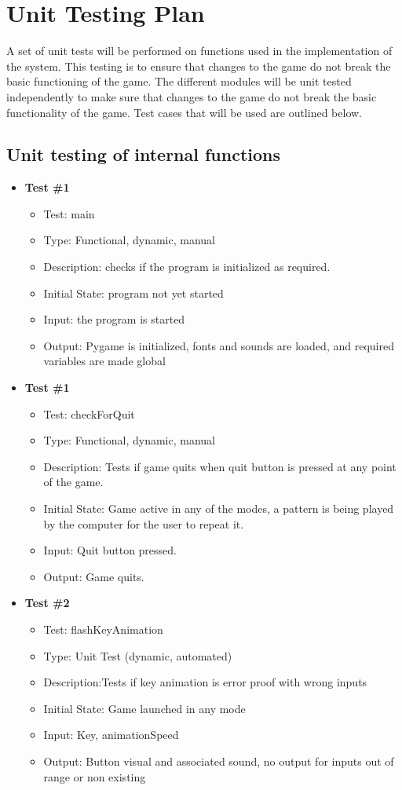 \documentclass[12pt, titlepage]{article}
\begin{document}
\section{Unit Testing Plan}
A set of unit tests will be performed on functions used in the implementation of the system. This testing is to ensure that changes to the game do not break the basic functioning of the game. The different modules will be unit tested independently to make sure that changes to the game do not break the basic functionality of the game. Test cases that will be used are outlined below.

\subsection{Unit testing of internal functions}

\begin{itemize}
\item \textbf{Test \#1}
\begin{itemize}
\item Test: main
\item Type: Functional, dynamic, manual		
\item Description: checks if the program is initialized as required.	
\item Initial State: program not yet started
\item Input: the program is started
\item Output:  Pygame is initialized, fonts and sounds are loaded, and required variables are made global
\end{itemize}

\item \textbf{Test \#1}
\begin{itemize}
\item Test: checkForQuit
\item Type: Functional, dynamic, manual		
\item Description: Tests if game quits when quit button is pressed at any point of the game.	
\item Initial State: Game active in any of the modes, a pattern is being played by the computer for the user to repeat it.
\item Input: Quit button pressed.
\item Output: Game quits.	
\end{itemize}

\item \textbf{Test \#2}
\begin{itemize}
\item Test: flashKeyAnimation
\item Type: Unit Test (dynamic, automated)			
\item Description:Tests if key animation is error proof with wrong inputs
\item Initial State: Game launched in any mode
\item Input: Key, animationSpeed
\item Output: Button visual and associated sound, no output for inputs out of range or non existing		
\end{itemize}


\end{itemize}
\end{document}
